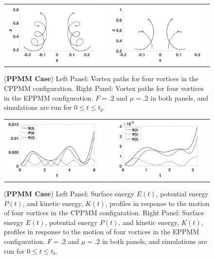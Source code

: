 \documentclass[a4paper,11pt]{article}
\begin{document}
%
\begin{figure}[!h]
\centering
\begin{tabular}{cc}
\includegraphics[width=.5\textwidth]{tracks_F_pt2_tf_6_ppmm} & 
\includegraphics[width=.5\textwidth]{tracks_F_pt2_tf_3pt2_ppmm_sym}
\end{tabular}
\caption{\small ({\bf PPMM Case}) Left Panel: Vortex paths for four vortices in the CPPMM configuration. Right Panel: Vortex paths for four vortices in the EPPMM configuration. $F=.2$ and $\mu=.2$ in both panels, and simulations are run for $0\leq t \leq t_{b}$.}
\label{fig:tracksppmm}
\end{figure}
%
\begin{figure}[!h]
\centering
\begin{tabular}{cc}
\includegraphics[width=.5\textwidth]{energy_profile_mu_pt2_F_pt2_ppmm} &
\includegraphics[width=.5\textwidth]{energy_profile_mu_pt2_F_pt2_ppmm_sym}
\end{tabular}
\caption{\small ({\bf PPMM Case})  Left Panel: Surface energy $E(t)$, potential energy $P(t)$, and kinetic energy, $K(t)$, profiles in response to the motion of four vortices in the CPPMM configuration. Right Panel: Surface energy $E(t)$, potential energy $P(t)$, and kinetic energy, $K(t)$, profiles in response to the motion of four vortices in the EPPMM configuration.  $F=.2$ and $\mu=.2$ in both panels, and simulations are run for $0\leq t \leq t_{b}$.}
\label{fig:eprof_ppmm}
\end{figure}
\end{document}
